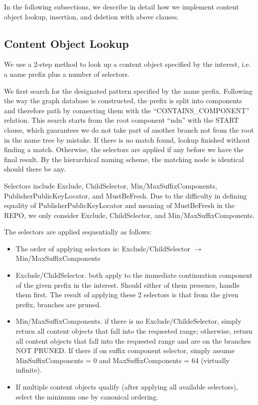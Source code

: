 In the following subsections, we describe in detail how we implement content object lookup, insertion, and deletion with above clauses.

\subsection{Content Object Lookup}

We use a 2-step method to look up a content object specified by the interest, i.e. a name prefix plus a number of selectors.

We first search for the designated pattern specified by the name prefix. Following the way the graph database is constructed, the prefix is split into components and therefore path by connecting them with the ``CONTAINS\_COMPONENT'' relation. This search starts from the root component ``ndn'' with the START clause, which guarantees we do not take part of another branch not from the root in the name tree by mistake. If there is no match found, lookup finished without finding a match. Otherwise, the selectors are applied if any before we have the final result. By the hierarchical naming scheme, the matching node is identical should there be any.

Selectors include Exclude, ChildSelector, Min/MaxSuffixComponents, PublisherPublicKeyLocator, and MustBeFresh. Due to the difficulty in defining equality of PublisherPublicKeyLocator and meaning of MustBeFresh in the REPO, we only consider Exclude, ChildSelector, and Min/MaxSuffixComponents. 

The selectors are applied sequentially as follows:
\begin{itemize}
    \item The order of applying selectors is: Exclude/ChildSelector $\rightarrow$ Min/MaxSuffixComponents
    \item Exclude/ChildSelector. both apply to the immediate continuation component of the given prefix in the interest. Should either of them presence, handle them first. The result of applying these 2 selectors is that from the given prefix, branches are pruned.
    \item Min/MaxSuffixComponents. if there is no Exclude/ChildeSelector, simply return all content objects that fall into the requested range; otherwise, return all content objects that fall into the requested range and are on the branches NOT PRUNED. If there if on suffix component selector, simply assume MinSuffixComponents = 0 and MaxSuffixComponents = 64 (virtually infinite).
    \item If multiple content objects qualify (after applying all available selectors), select the minimum one by canonical ordering.
\end{itemize}

